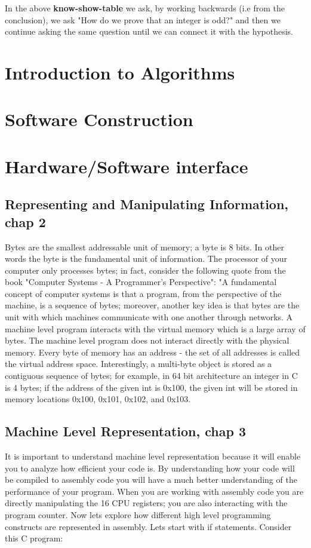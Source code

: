 \documentclass[10pt]{article}
\begin{document}
In the above \textbf{know-show-table} we ask, by working backwards (i.e from the conclusion), we ask "How do we prove that an integer is odd?" and then we continue asking the same question until we can connect it with the hypothesis.

\section{Introduction to Algorithms}

\section{Software Construction}

\section{Hardware/Software interface}

\subsection{Representing and Manipulating Information, chap 2}
Bytes are the smallest addressable unit of memory; a byte is 8 bits. In other words the byte is the fundamental unit of information. The processor of your computer only processes bytes; in fact, consider the following quote from the book "Computer Systems - A Programmer's Perspective": "A fundamental concept of computer systems is that a program, from the perspective of the machine, is a sequence of bytes; moreover, another key idea is that bytes are the unit with which machines communicate with one another through networks. A machine level program interacts with the virtual memory which is a large array of bytes. The machine level program does not interact directly with the physical memory. Every byte of memory has an address - the set of all addresses is called the virtual address space. Interestingly, a multi-byte object is stored as a contiguous sequence of  bytes; for example, in 64 bit architecture an integer in C is 4 bytes; if the address of the given int is 0x100, the given int will be stored in memory locations 0x100, 0x101, 0x102, and 0x103.

\subsection{Machine Level Representation, chap 3}
It is important to understand machine level representation because it will enable you to analyze how efficient your code is. By understanding how your code will be compiled to assembly code you will have a much better understanding of the performance of your program. When you are working with assembly code you are directly manipulating the 16 CPU registers; you are also interacting with the program counter. Now lets explore how different high level programming constructs are represented in assembly. Lets start with if statements. Consider this C program: 
\end{document}
